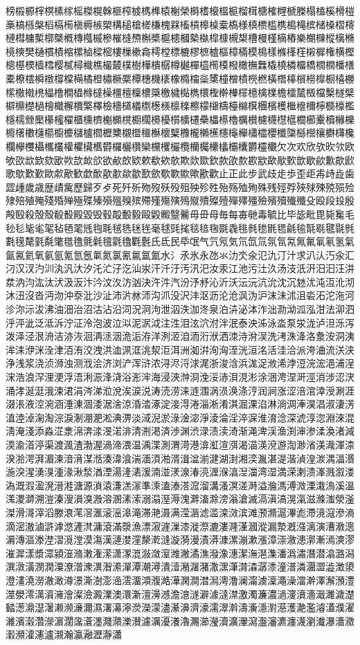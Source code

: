 榜榝榞榟榠榡榢榣榤榥榦榧榨榩榪榫榬榭榮榯榰榱榲榳榴榵榶榷榸榹榺榻榼榽榾榿槀槁槂槃槄槅槆槇槈槉槊構槌槍槎槏槐槑槒槓槔槕槖槗様槙槚槛槜槝槞槟槠槡槢槣槤槥槦槧槨槩槪槫槬槭槮槯槰槱槲槳槴槵槶槷槸槹槺槻槼槽槾槿樀樁樂樃樄樅樆樇樈樉樊樋樌樍樎樏樐樑樒樓樔樕樖樗樘標樚樛樜樝樞樟樠模樢樣樤樥樦樧樨権横樫樬樭樮樯樰樱樲樳樴樵樶樷樸樹樺樻樼樽樾樿橀橁橂橃橄橅橆橇橈橉橊橋橌橍橎橏橐橑橒橓橔橕橖橗橘橙橚橛橜橝橞機橠橡橢橣橤橥橦橧橨橩橪橫橬橭橮橯橰橱橲橳橴橵橶橷橸橹橺橻橼橽橾橿檀檁檂檃檄檅檆檇檈檉檊檋檌檍檎檏檐檑檒檓檔檕檖檗檘檙檚檛檜檝檞檟檠檡檢檣檤檥檦檧檨檩檪檫檬檭檮檯檰檱檲檳檴檵檶檷檸檹檺檻檼檽檾檿櫀櫁櫂櫃櫄櫅櫆櫇櫈櫉櫊櫋櫌櫍櫎櫏櫐櫑櫒櫓櫔櫕櫖櫗櫘櫙櫚櫛櫜櫝櫞櫟櫠櫡櫢櫣櫤櫥櫦櫧櫨櫩櫪櫫櫬櫭櫮櫯櫰櫱櫲櫳櫴櫵櫶櫷櫸櫹櫺櫻櫼櫽櫾櫿欀欁欂欃欄欅欆欇欈欉權欋欌欍欎欏欐欑欒欓欔欕欖欗欘欙欚欛欜欝欞欟欠次欢欣欤欥欦欧欨欩欪欫欬欭欮欯欰欱欲欳欴欵欶欷欸欹欺欻欼欽款欿歀歁歂歃歄歅歆歇歈歉歊歋歌歍歎歏歐歑歒歓歔歕歖歗歘歙歚歛歜歝歞歟歠歡止正此步武歧歨歩歪歫歬歭歮歯歰歱歲歳歴歵歶歷歸歹歺死歼歽歾歿殀殁殂殃殄殅殆殇殈殉殊残殌殍殎殏殐殑殒殓殔殕殖殗殘殙殚殛殜殝殞殟殠殡殢殣殤殥殦殧殨殩殪殫殬殭殮殯殰殱殲殳殴段殶殷殸殹殺殻殼殽殾殿毀毁毂毃毄毅毆毇毈毉毊毋毌母毎每毐毑毒毓比毕毖毗毘毙毚毛毜毝毞毟毠毡毢毣毤毥毦毧毨毩毪毫毬毭毮毯毰毱毲毳毴毵毶毷毸毹毺毻毼毽毾毿氀氁氂氃氄氅氆氇氈氉氊氋氌氍氎氏氐民氒氓气氕氖気氘氙氚氛氜氝氞氟氠氡氢氣氤氥氦氧氨氩氪氫氬氭氮氯氰氱氲氳水氵氶氷永氹氺氻氼氽氾氿汀汁求汃汄汅汆汇汈汉汊汋汌汍汎汏汐汑汒汓汔汕汖汗汘汙汚汛汜汝汞江池污汢汣汤汥汦汧汨汩汪汫汬汭汮汯汰汱汲汳汴汵汶汷汸汹決汻汼汽汾汿沀沁沂沃沄沅沆沇沈沉沊沋沌沍沎沏沐沑沒沓沔沕沖沗沘沙沚沛沜沝沞沟沠没沢沣沤沥沦沧沨沩沪沫沬沭沮沯沰沱沲河沴沵沶沷沸油沺治沼沽沾沿泀況泂泃泄泅泆泇泈泉泊泋泌泍泎泏泐泑泒泓泔法泖泗泘泙泚泛泜泝泞泟泠泡波泣泤泥泦泧注泩泪泫泬泭泮泯泰泱泲泳泴泵泶泷泸泹泺泻泼泽泾泿洀洁洂洃洄洅洆洇洈洉洊洋洌洍洎洏洐洑洒洓洔洕洖洗洘洙洚洛洜洝洞洟洠洡洢洣洤津洦洧洨洩洪洫洬洭洮洯洰洱洲洳洴洵洶洷洸洹洺活洼洽派洿浀流浂浃浄浅浆浇浈浉浊测浌浍济浏浐浑浒浓浔浕浖浗浘浙浚浛浜浝浞浟浠浡浢浣浤浥浦浧浨浩浪浫浬浭浮浯浰浱浲浳浴浵浶海浸浹浺浻浼浽浾浿涀涁涂涃涄涅涆涇消涉涊涋涌涍涎涏涐涑涒涓涔涕涖涗涘涙涚涛涜涝涞涟涠涡涢涣涤涥润涧涨涩涪涫涬涭涮涯涰涱液涳涴涵涶涷涸涹涺涻涼涽涾涿淀淁淂淃淄淅淆淇淈淉淊淋淌淍淎淏淐淑淒淓淔淕淖淗淘淙淚淛淜淝淞淟淠淡淢淣淤淥淦淧淨淩淪淫淬淭淮淯淰深淲淳淴淵淶混淸淹淺添淼淽淾淿渀渁渂渃渄清渆渇済渉渊渋渌渍渎渏渐渑渒渓渔渕渖渗渘渙渚減渜渝渞渟渠渡渢渣渤渥渦渧渨温渪渫測渭渮港渰渱渲渳渴渵渶渷游渹渺渻渼渽渾渿湀湁湂湃湄湅湆湇湈湉湊湋湌湍湎湏湐湑湒湓湔湕湖湗湘湙湚湛湜湝湞湟湠湡湢湣湤湥湦湧湨湩湪湫湬湭湮湯湰湱湲湳湴湵湶湷湸湹湺湻湼湽湾湿満溁溂溃溄溅溆溇溈溉溊溋溌溍溎溏源溑溒溓溔溕準溗溘溙溚溛溜溝溞溟溠溡溢溣溤溥溦溧溨溩溪溫溬溭溮溯溰溱溲溳溴溵溶溷溸溹溺溻溼溽溾溿滀滁滂滃滄滅滆滇滈滉滊滋滌滍滎滏滐滑滒滓滔滕滖滗滘滙滚滛滜滝滞滟滠满滢滣滤滥滦滧滨滩滪滫滬滭滮滯滰滱滲滳滴滵滶滷滸滹滺滻滼滽滾滿漀漁漂漃漄漅漆漇漈漉漊漋漌漍漎漏漐漑漒漓演漕漖漗漘漙漚漛漜漝漞漟漠漡漢漣漤漥漦漧漨漩漪漫漬漭漮漯漰漱漲漳漴漵漶漷漸漹漺漻漼漽漾漿潀潁潂潃潄潅潆潇潈潉潊潋潌潍潎潏潐潑潒潓潔潕潖潗潘潙潚潛潜潝潞潟潠潡潢潣潤潥潦潧潨潩潪潫潬潭潮潯潰潱潲潳潴潵潶潷潸潹潺潻潼潽潾潿澀澁澂澃澄澅澆澇澈澉澊澋澌澍澎澏澐澑澒澓澔澕澖澗澘澙澚澛澜澝澞澟澠澡澢澣澤澥澦澧澨澩澪澫澬澭澮澯澰澱澲澳澴澵澶澷澸澹澺澻澼澽澾澿激濁濂濃濄濅濆濇濈濉濊濋濌濍濎濏濐濑濒濓濔濕濖濗濘濙濚濛濜濝濞濟濠濡濢濣濤濥濦濧濨濩濪濫濬濭濮濯濰濱濲濳濴濵濶濷濸濹濺濻濼濽濾濿瀀瀁瀂瀃瀄瀅瀆瀇瀈瀉瀊瀋瀌瀍瀎瀏瀐瀑瀒瀓瀔瀕瀖瀗瀘瀙瀚瀛瀜瀝瀞瀟